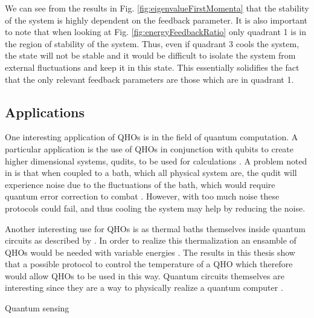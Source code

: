 We can see from the results in Fig. \ref{fig:eigenvalueFirstMomenta} that the stability of the system is highly dependent on the feedback parameter. It is also important to note that when looking at Fig. \ref{fig:energyFeedbackRatio} only quadrant 1 is in the region of stability of the system. Thus, even if quadrant 3 cools the system, the state will not be stable and it would be difficult to isolate the system from external fluctuations and keep it in this state. This essentially solidifies the fact that the only relevant feedback parameters are those which are in quadrant 1. 


\subsection{Applications}
One interesting application of QHOs is in the field of quantum computation. A particular application is the use of QHOs in conjunction with qubits to create higher dimensional systems, qudits, to be used for calculations \cite{Liu:2021}. A problem noted in \cite{Liu:2021} is that when coupled to a bath, which all physical system are, the qudit will experience noise due to the fluctuations of the bath, which would require quantum error correction to combat \cite{Liu:2021}. However, with too much noise these protocols could fail, and thus cooling the system may help by reducing the noise.

Another interesting use for QHOs is as thermal baths themselves inside quantum circuits as described by \cite{Pekola:2024}. In order to realize this thermalization an ensamble of QHOs would be needed with variable energies \cite{Pekola:2024}. The results in this thesis show that a possible protocol to control the temperature of a QHO which therefore would allow QHOs to be used in this way. Quantum circuits themselves are interesting since they are a way to physically realize a quantum computer \cite{Nielsen:2010}. 



Quantum sensing\\
